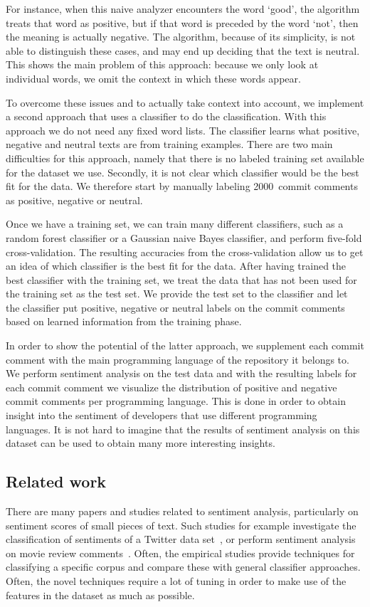 \documentclass{article}
\begin{document}
For instance, when this naive analyzer encounters the word `good', the 
algorithm treats that word as positive, but if that word is preceded by the 
word `not', then the meaning is actually negative. The algorithm, because of 
its simplicity, is not able to distinguish these cases, and may end up deciding 
that the text is neutral. This shows the main problem of this approach: because 
we only look at individual words, we omit the context in which these words 
appear.

To overcome these issues and to actually take context into account, we implement
a second approach that uses a classifier to do the classification. With this
approach we do not need any fixed word lists. The classifier learns what
positive, negative and neutral texts are from training examples. There are two
main difficulties for this approach, namely that there is no labeled training
set available for the dataset we use. Secondly, it is not clear which 
classifier would be the best fit for the data. We therefore start by manually 
labeling 2000~commit comments as positive, negative or neutral.

Once we have a training set, we can train many different classifiers, such as 
a random forest classifier or a Gaussian naive Bayes classifier, and perform 
five-fold cross-validation. The resulting accuracies from the cross-validation 
allow us to get an idea of which classifier is the best fit for the data. After 
having trained the best classifier with the training set, we treat the data 
that has not been used for the training set as the test set. We provide the 
test set to the classifier and let the classifier put positive, negative or 
neutral labels on the commit comments based on learned information from the 
training phase.

In order to show the potential of the latter approach, we supplement each 
commit comment with the main programming language of the repository it belongs 
to. We perform sentiment analysis on the test data and with the resulting 
labels for each commit comment we visualize the distribution of positive and 
negative commit comments per programming language. This is done in order to 
obtain insight into the sentiment of developers that use different programming 
languages. It is not hard to imagine that the results of sentiment analysis on 
this dataset can be used to obtain many more interesting insights.

\subsection{Related work}\label{sec:related-work}
There are many papers and studies related to sentiment analysis, particularly 
on sentiment scores of small pieces of text. Such studies for example 
investigate the classification of sentiments of a Twitter data 
set~\cite{agarwal2011twitter,kouloumpis2011twitter}, or perform sentiment 
analysis on movie review comments~\cite{yessenov2009sentiment}. Often, the 
empirical studies provide techniques for classifying a specific corpus and 
compare these with general classifier approaches. Often, the novel techniques 
require a lot of tuning in order to make use of the features in the dataset as 
much as possible.
\end{document}
